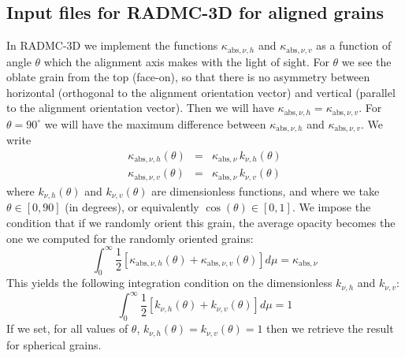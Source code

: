 \documentclass{report}
\begin{document}
\subsection{Input files for RADMC-3D for aligned grains}
In RADMC-3D we implement the functions $\kappa_{\mathrm{abs},\nu,h}$ and
$\kappa_{\mathrm{abs},\nu,v}$ as a function of angle $\theta$ which the
alignment axis makes with the light of sight. For $\theta$ we see the oblate
grain from the top (face-on), so that there is no asymmetry between
horizontal (orthogonal to the alignment orientation vector) and vertical
(parallel to the alignment orientation vector). Then we will have
$\kappa_{\mathrm{abs},\nu,h}=\kappa_{\mathrm{abs},\nu,v}$. For
$\theta=90^{\circ}$ we will have the maximum difference between
$\kappa_{\mathrm{abs},\nu,h}$ and $\kappa_{\mathrm{abs},\nu,v}$. We write
\begin{eqnarray}
\kappa_{\mathrm{abs},\nu,h}(\theta) &=& \kappa_{\mathrm{abs},\nu}\,k_{\nu,h}(\theta) \label{eq-align-kappa-k-h}\\
\kappa_{\mathrm{abs},\nu,v}(\theta) &=& \kappa_{\mathrm{abs},\nu}\,k_{\nu,v}(\theta) \label{eq-align-kappa-k-v}
\end{eqnarray}
where $k_{\nu,h}(\theta)$ and $k_{\nu,v}(\theta)$ are dimensionless
functions, and where we take $\theta\in[0,90]$ (in degrees), or equivalently
$\cos(\theta)\in [0,1]$. We impose the condition that if we randomly orient
this grain, the average opacity becomes the one we computed for the randomly
oriented grains:
\begin{equation}
\int_0^\infty \frac{1}{2}\left[\kappa_{\mathrm{abs},\nu,h}(\theta)
+\kappa_{\mathrm{abs},\nu,v}(\theta)\right]d\mu = \kappa_{\mathrm{abs},\nu}
\end{equation}
This yields the following integration condition on the dimensionless
$k_{\nu,h}$ and $k_{\nu,v}$:
\begin{equation}
\int_0^\infty \frac{1}{2}\left[k_{\nu,h}(\theta)+k_{\nu,v}(\theta)\right]d\mu = 1
\end{equation}
If we set, for all values of $\theta$,
$k_{\nu,h}(\theta)=k_{\nu,v}(\theta)=1$ then we retrieve the result for
spherical grains.
\end{document}
